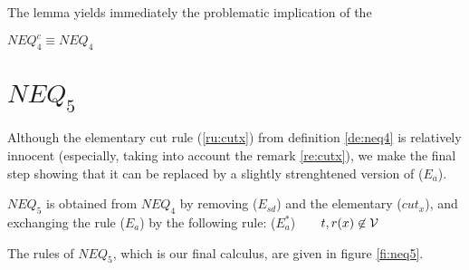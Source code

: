 

The lemma yields immediately the problematic implication of the 
\begin{THEOREM}\label{th:neq4cisneq4}
 $NEQ_4^c \equiv NEQ_4$ \end{THEOREM}

\section{$NEQ_5$}
Although the elementary cut rule (\ref{ru:cutx}) from definition \ref{de:neq4}
is relatively innocent (especially, taking into account the remark
\ref{re:cutx}), we make the final step showing that it can be replaced by a
slightly strenghtened version of ($E_a$).
\begin{DEFINITION}\label{de:neq5}
 $NEQ_5$ is obtained from $NEQ_4$ by removing ($E_{sd}$) and the elementary
 ($cut_x$), and exchanging the rule ($E_a$) by the following rule:
 ($E_a^*$)\ \ \ \ $t,r(x)\not\in{\cal V}$
\end{DEFINITION}
The rules of $NEQ_5$, which is our final calculus, are given in figure \ref{fi:neq5}.

